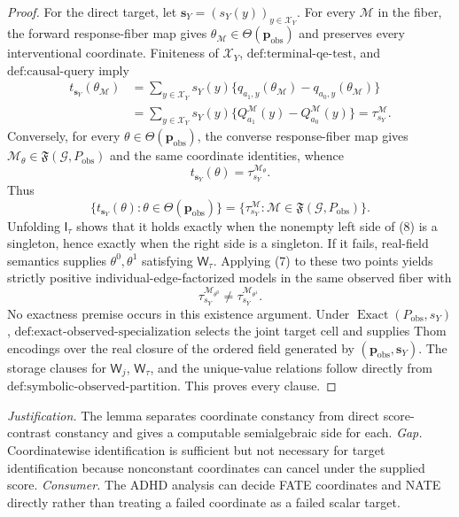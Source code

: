 \documentclass{article}
\begin{document}
\begin{proof}
For the direct target, let \(\mathbf s_Y=(s_Y(y))_{y\in\mathcal X_Y}\).  For every \(\mathcal M\) in the fiber, the forward response-fiber map gives \(\theta_{\mathcal M}\in\Theta(\mathbf p_{\mathrm{obs}})\) and preserves every interventional coordinate.  Finiteness of \(\mathcal X_Y\), \(\text{def:terminal-qe-test}\), and \(\text{def:causal-query}\) imply
\[
\begin{aligned}
t_{\mathbf s_Y}(\theta_{\mathcal M})
&=\sum_{y\in\mathcal X_Y}s_Y(y)
\{q_{a_1,y}(\theta_{\mathcal M})-q_{a_0,y}(\theta_{\mathcal M})\}\\
&=\sum_{y\in\mathcal X_Y}s_Y(y)
\{Q_{a_1}^{\mathcal M}(y)-Q_{a_0}^{\mathcal M}(y)\}
=\tau_{s_Y}^{\mathcal M}.
\end{aligned}
\tag{6}
\]
Conversely, for every \(\theta\in\Theta(\mathbf p_{\mathrm{obs}})\), the converse response-fiber map gives \(\mathcal M_\theta\in\mathfrak F(\mathcal G,P_{\mathrm{obs}})\) and the same coordinate identities, whence
\[
t_{\mathbf s_Y}(\theta)=\tau_{s_Y}^{\mathcal M_\theta}.
\tag{7}
\]
Thus
\[
\{t_{\mathbf s_Y}(\theta):\theta\in\Theta(\mathbf p_{\mathrm{obs}})\}
=\{\tau_{s_Y}^{\mathcal M}:\mathcal M\in\mathfrak F(\mathcal G,P_{\mathrm{obs}})\}.
\tag{8}
\]
Unfolding \(\mathsf I_\tau\) shows that it holds exactly when the nonempty left side of (8) is a singleton, hence exactly when the right side is a singleton.  If it fails, real-field semantics supplies \(\theta^0,\theta^1\) satisfying \(\mathsf W_\tau\).  Applying (7) to these two points yields strictly positive individual-edge-factorized models in the same observed fiber with
\[
\tau_{s_Y}^{\mathcal M_{\theta^0}}
\neq
\tau_{s_Y}^{\mathcal M_{\theta^1}}.
\tag{9}
\]
No exactness premise occurs in this existence argument.  Under \(\operatorname{Exact}(P_{\mathrm{obs}},s_Y)\), \(\text{def:exact-observed-specialization}\) selects the joint target cell and supplies Thom encodings over the real closure of the ordered field generated by \((\mathbf p_{\mathrm{obs}},\mathbf s_Y)\).  The storage clauses for \(\mathsf W_j\), \(\mathsf W_\tau\), and the unique-value relations follow directly from \(\text{def:symbolic-observed-partition}\).  This proves every clause.
\end{proof}
\par\smallskip\noindent \textit{Justification.} The lemma separates coordinate constancy from direct score-contrast constancy and gives a computable semialgebraic side for each. \textit{Gap.} Coordinatewise identification is sufficient but not necessary for target identification because nonconstant coordinates can cancel under the supplied score. \textit{Consumer.} The ADHD analysis can decide FATE coordinates and NATE directly rather than treating a failed coordinate as a failed scalar target.
\end{document}
